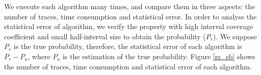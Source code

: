 We execute each algorithm many times, and compare them in three aspects: the number of traces, time consumption and statistical error. In order to analyse the statistical error of algorithm, we verify the property with high interval coverage coefficient and small half-interval size to obtain the probability ($P_r$). We suppose $P_r$ is the true probability, therefore, the statistical error of each algorithm is $P_r - P_a$, where $P_a$ is the estimation of the true probability. Figure \ref{rs_sb} shows the number of traces, time consumption and statistical error of each algorithm.

\begin{figure}[htbp]
\end{figure}

